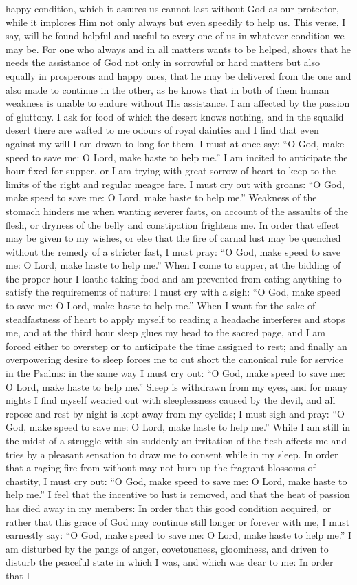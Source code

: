 happy condition, which it assures us cannot last without God as our protector, while it implores Him not only always but even speedily to help us. This verse, I say, will be found helpful and useful to every one of us in whatever condition we may be. For one who always and in all matters wants to be helped, shows that he needs the assistance of God not only in sorrowful or hard matters but also equally in prosperous and happy ones, that he may be delivered from the one and also made to continue in the other, as he knows that in both of them human weakness is unable to endure without His assistance. I am affected by the passion of gluttony. I ask for food of which the desert knows nothing, and in the squalid desert there are wafted to me odours of royal dainties and I find that even against my will I am drawn to long for them. I must at once say: “O God, make speed to save me: O Lord, make haste to help me.” I am incited to anticipate the hour fixed for supper, or I am trying with great sorrow of heart to keep to the limits of the right and regular meagre fare. I must cry out with groans: “O God, make speed to save me: O Lord, make haste to help me.” Weakness of the stomach hinders me when wanting severer fasts, on account of the assaults of the flesh, or dryness of the belly and constipation frightens me. In order that effect may be given to my wishes, or else that the fire of carnal lust may be quenched without the remedy of a stricter fast, I must pray: “O God, make speed to save me: O Lord, make haste to help me.” When I come to supper, at the bidding of the proper hour I loathe taking food and am prevented from eating anything to satisfy the requirements of nature: I must cry with a sigh: “O God, make speed to save me: O Lord, make haste to help me.” When I want for the sake of steadfastness of heart to apply myself to reading a headache interferes and stops me, and at the third hour sleep glues my head to the sacred page, and I am forced either to overstep or to anticipate the time assigned to rest; and finally an overpowering desire to sleep forces me to cut short the canonical rule for service in the Psalms: in the same way I must cry out: “O God, make speed to save me: O Lord, make haste to help me.” Sleep is withdrawn from my eyes, and for many nights I find myself wearied out with sleeplessness caused by the devil, and all repose and rest by night is kept away from my eyelids; I must sigh and pray: “O God, make speed to save me: O Lord, make haste to help me.” While I am still in the midst of a struggle with sin suddenly an irritation of the flesh affects me and tries by a pleasant sensation to draw me to consent while in my sleep. In order that a raging fire from without may not burn up the fragrant blossoms of chastity, I must cry out: “O God, make speed to save me: O Lord, make haste to help me.” I feel that the incentive to lust is removed, and that the heat of passion has died away in my members: In order that this good condition acquired, or rather that this grace of God may continue still longer or forever with me, I must earnestly say: “O God, make speed to save me: O Lord, make haste to help me.” I am disturbed by the pangs of anger, covetousness, gloominess, and driven to disturb the peaceful state in which I was, and which was dear to me: In order that I 